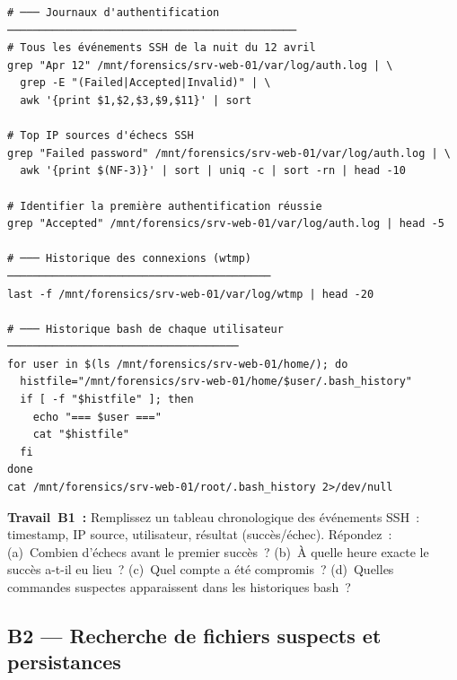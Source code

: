\begin{lstlisting}[style=StyleTerminal,
  caption={Analyse d'auth.log sur l'image montée},
  label={lst:lab2-authlog}]
# ─── Journaux d'authentification ─────────────────────────────────────────────
# Tous les événements SSH de la nuit du 12 avril
grep "Apr 12" /mnt/forensics/srv-web-01/var/log/auth.log | \
  grep -E "(Failed|Accepted|Invalid)" | \
  awk '{print $1,$2,$3,$9,$11}' | sort

# Top IP sources d'échecs SSH
grep "Failed password" /mnt/forensics/srv-web-01/var/log/auth.log | \
  awk '{print $(NF-3)}' | sort | uniq -c | sort -rn | head -10

# Identifier la première authentification réussie
grep "Accepted" /mnt/forensics/srv-web-01/var/log/auth.log | head -5

# ─── Historique des connexions (wtmp) ─────────────────────────────────────────
last -f /mnt/forensics/srv-web-01/var/log/wtmp | head -20

# ─── Historique bash de chaque utilisateur ────────────────────────────────────
for user in $(ls /mnt/forensics/srv-web-01/home/); do
  histfile="/mnt/forensics/srv-web-01/home/$user/.bash_history"
  if [ -f "$histfile" ]; then
    echo "=== $user ==="
    cat "$histfile"
  fi
done
cat /mnt/forensics/srv-web-01/root/.bash_history 2>/dev/null
\end{lstlisting}

\begin{boxexo}
\textbf{Travail~B1~:} Remplissez un tableau chronologique des
événements SSH~: timestamp, IP source, utilisateur, résultat
(succès/échec). Répondez~:
(a)~Combien d'échecs avant le premier succès~?
(b)~À quelle heure exacte le succès a-t-il eu lieu~?
(c)~Quel compte a été compromis~?
(d)~Quelles commandes suspectes apparaissent dans les historiques bash~?
\end{boxexo}

\subsection{B2 — Recherche de fichiers suspects et persistances}

